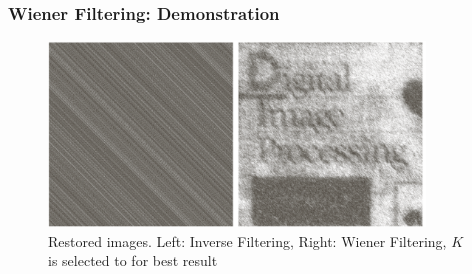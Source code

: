 \documentclass[english,11pt,table,handout]{beamer}
\begin{document}
\frame
{
	\frametitle{Wiener Filtering: Demonstration }
	
	\begin{figure}[!h]
		\includegraphics[width=10cm]{book_restore_1.png}
		\caption{Restored images. Left: \alert{Inverse Filtering}, Right: \alert{Wiener Filtering}, $K$ is selected to for best result}
	\end{figure}

}
\end{document}
